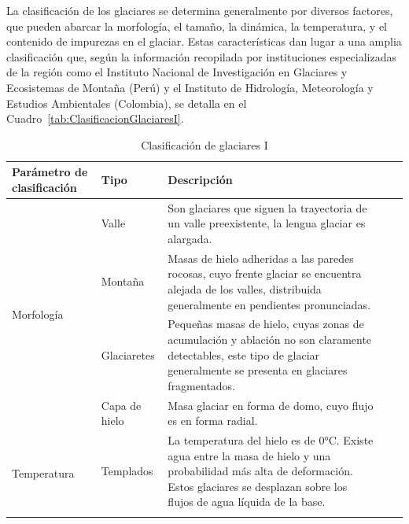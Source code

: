 La clasificación de los glaciares se determina generalmente por diversos factores, que pueden abarcar la morfología, el tamaño, la dinámica, la temperatura, y el contenido de impurezas en el glaciar. Estas características dan lugar a una amplia clasificación que, según la información recopilada por instituciones especializadas de la región como el Instituto Nacional de Investigación en Glaciares y Ecosistemas de Montaña (Perú) y el Instituto de Hidrología, Meteorología y Estudios Ambientales (Colombia), se detalla en el Cuadro~\ref{tab:ClasificacionGlaciaresI}.

\begin{table}[H]
    \caption{Clasificación de glaciares I}
    \small
    \begin{tabularx}{\linewidth}{@{} *5{X} @{}}
        \hline
        \textbf{Parámetro de clasificación}        & \textbf{Tipo} & \textbf{Descripción}                                                                                                                                                                         \\ \hline
        \multirow{4}{=}{\parbox{4cm}{Morfología}}  & Valle         & Son glaciares que siguen la trayectoria de un valle preexistente, la lengua glaciar es alargada.                                                                                             \\ \cline{2-3}
                                                   & Montaña       & Masas de hielo adheridas a las paredes rocosas, cuyo frente glaciar se encuentra alejada de los valles, distribuida generalmente en pendientes pronunciadas.                                 \\ \cline{2-3}
                                                   & Glaciaretes   & Pequeñas masas de hielo, cuyas zonas de acumulación y ablación no son claramente detectables, este tipo de glaciar generalmente se presenta en glaciares fragmentados.                       \\ \cline{2-3}
                                                   & Capa de hielo & Masa glaciar en forma de domo, cuyo flujo es en forma radial.                                                                                                                                \\ \hline
        \multirow{2}{=}{\parbox{4cm}{Temperatura}} & Templados     & La temperatura del hielo es de 0°C. Existe agua entre la masa de hielo y una probabilidad más alta de deformación. Estos glaciares se desplazan sobre los flujos de agua líquida de la base. \\ \cline{2-3}

\end{tabularx}
\end{table}
